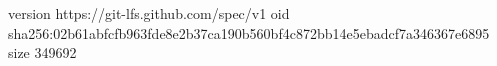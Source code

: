 version https://git-lfs.github.com/spec/v1
oid sha256:02b61abfcfb963fde8e2b37ca190b560bf4c872bb14e5ebadcf7a346367e6895
size 349692
